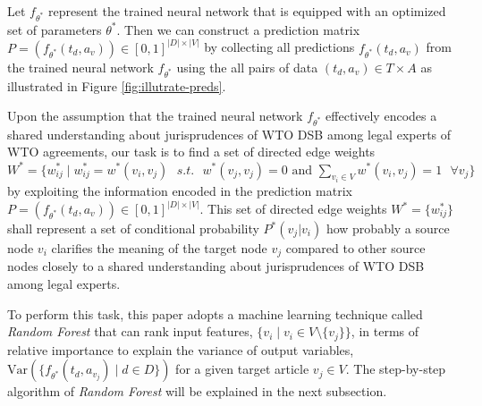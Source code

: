 Let $f_{\theta^*}$ represent the trained neural network that is equipped with an optimized set of parameters $\theta^*$.
Then we can construct a prediction matrix $P = (f_{\theta^*}(t_d, a_v)) \in [0,1]^{{|D| \times |V|}}$  by collecting all predictions $f_{\theta^*}(t_d, a_v)$ from the trained neural network $f_{\theta^{*}}$ using the all pairs of data $(t_d,a_v) \in T \times A$ as illustrated in Figure \ref{fig:illutrate-preds}.
 
Upon the assumption that the trained neural network $f_{\theta^*}$ effectively encodes a shared understanding about jurisprudences of WTO DSB among legal experts of WTO agreements, our task is to find a set of directed edge weights $W^* = \{w^{*}_{ij} \mid w^{*}_{ij} = w^{*}(v_i, v_j) \text{ } s.t. \text{ } w^{*}(v_j, v_j) = 0 \text{ and } \sum_{v_i\in V}{w^{*}(v_i, v_j)} = 1 \text{ } \forall v_j \}$ %
by exploiting the information encoded in the prediction matrix $P = (f_{\theta^*}(t_d, a_v)) \in [0,1]^{{|D| \times |V|}}$. This set of directed edge weights $W^{*} = \{w^{*}_{ij}\}$ shall represent a set of conditional probability $P^{*}(v_j|v_i)$ how probably a source node $v_i$ clarifies the meaning of the target node $v_j$ compared to other source nodes
closely to a shared understanding about jurisprudences of WTO DSB among legal experts. %
 
To perform this task, this paper adopts a machine learning technique called \textit{Random Forest} that can rank input features, $\{v_i \mid v_i \in V \setminus \{v_j\}\}$, in terms of relative importance to explain the variance of output variables, $\text{Var}(\{f_{\theta^*}(t_d, a_{v_j}) \mid d \in D \})$ for a given target article $v_j \in V$. The step-by-step algorithm of \textit{Random Forest} will be explained in the next subsection.

 
 
 

